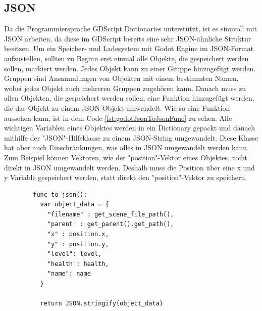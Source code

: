 \subsection{JSON}
Da die Programmiersprache GDScript Dictionaries unterstützt, ist es sinnvoll mit JSON arbeiten, da diese im GDScript bereits eine sehr JSON-ähnliche Struktur besitzen. Um ein Speicher- und Ladesystem mit Godot Engine im JSON-Format aufzustellen, sollten zu Beginn erst einmal alle Objekte, die gespeichert werden sollen, markiert werden. Jedes Objekt kann zu einer Gruppe hinzugefügt werden. Gruppen sind Ansammlungen von Objekten mit einem bestimmten Namen, wobei jedes Objekt auch mehreren Gruppen zugehören kann. Danach muss zu allen Objekten, die gespeichert werden sollen, eine Funktion hinzugefügt werden, die das Objekt zu einem JSON-Objekt umwandelt. Wie so eine Funktion aussehen kann, ist in dem Code \ref{lst:godotJsonToJsonFunc} zu sehen. Alle wichtigen Variablen eines Objektes werden in ein Dictionary gepackt und danach mithilfe der "JSON"-Hilfsklasse zu einem JSON-String umgewandelt. Diese Klasse hat aber auch Einschränkungen, was alles in JSON umgewandelt werden kann. Zum Beispiel können Vektoren, wie der "position"-Vektor eines Objektes, nicht direkt in JSON umgewandelt werden. Deshalb muss die Position über eine x und y Variable gespeichert werden, statt direkt den "position"-Vektor zu speichern.\cite{godotengineSavingGames}

\begin{listing}[htp]
    \begin{verbatim}
        func to_json():
          var object_data = {
            "filename" : get_scene_file_path(),
            "parent" : get_parent().get_path(),
            "x" : position.x, 
            "y" : position.y,
            "level": level,
            "health": health,
            "name": name
          }

          return JSON.stringify(object_data)
    \end{verbatim}
    \caption{Beispiel für das Speichern mit JSON in Godot\cite{godotengineSavingGames} }
    \label{lst:godotJsonToJsonFunc}
\end{listing}

